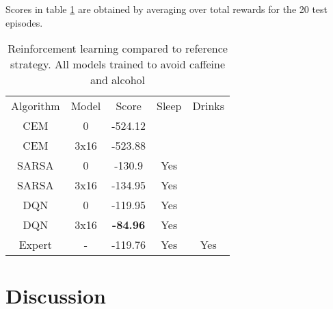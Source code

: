 Scores in table \ref{tab:heartpole-results} are obtained by averaging over total rewards for the 20 test episodes.

\begin{table}[]
    \centering
    \begin{tabular}{c|c|c|c|c}
         Algorithm & Model & Score & Sleep & Drinks \\
         CEM & 0 & -524.12 &  &   \\
         CEM & 3x16 & -523.88 & & \\
         SARSA & 0 & -130.9 & Yes & \\
         SARSA & 3x16 & -134.95 & Yes & \\
         DQN & 0 & -119.95 & Yes &  \\
         DQN & 3x16 & \textbf{-84.96} & Yes &  \\
         Expert & - & -119.76 & Yes & Yes 
    \end{tabular}
    \caption{Reinforcement learning compared to reference strategy. All models trained to avoid caffeine and alcohol}
    \label{tab:heartpole-results}
\end{table}



\newpage
\section{Discussion}